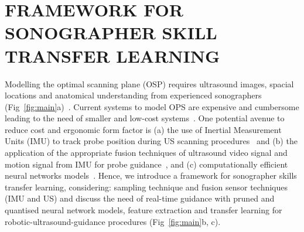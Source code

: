 \documentclass[a4paper, 10pt, conference]{ieeeconf}      %
\begin{document}
\section{FRAMEWORK FOR SONOGRAPHER SKILL TRANSFER LEARNING}
Modelling the optimal scanning plane (OSP) requires ultrasound images, spacial locations and anatomical understanding from experienced sonographers (Fig~\ref{fig:main}a)~\cite{deng2021,vonHaxthausen2021}.
Current systems to model OPS are expensive and cumbersome leading to the need of smaller and low-cost systems~\cite{Dressler2021}. 
One potential avenue to reduce cost and ergonomic form factor is (a) the use of Inertial Measurement Units (IMU) to track probe position during US scanning procedures~\cite{PREVOST2018187}
and (b) the application of the appropriate fusion techniques of ultrasound video signal and motion signal from IMU for probe guidance~\cite{droste2020}, and (c) computationally efficient neural networks models~\cite{deng2021}.
Hence, we introduce a framework for sonographer skills transfer learning, considering: sampling technique and fusion sensor techniques (IMU and US) and discuss the need of real-time guidance with  pruned and quantised neural network models, feature extraction and transfer learning for robotic-ultrasound-guidance procedures (Fig~\ref{fig:main}b, c).



\end{document}
